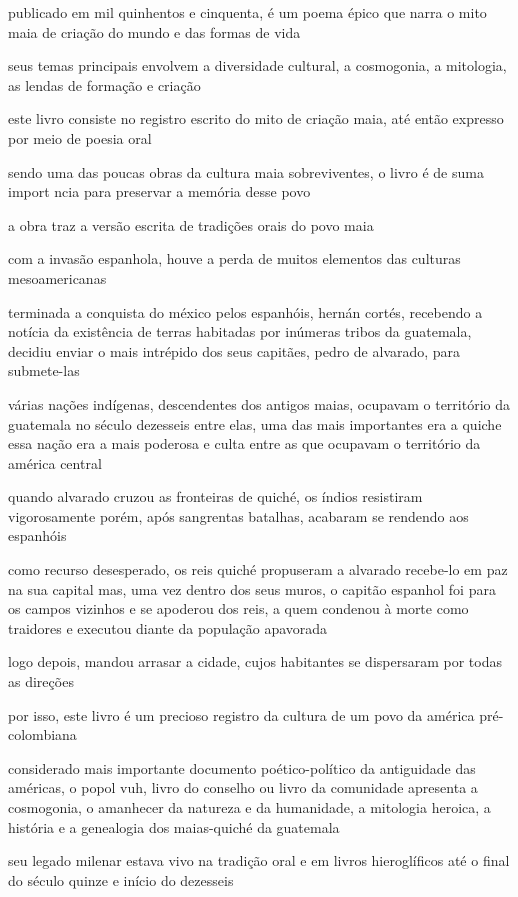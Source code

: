 publicado em mil quinhentos e cinquenta, é um poema épico que narra o mito maia de criação do mundo e das formas de vida

seus temas principais envolvem a diversidade cultural, a cosmogonia, a mitologia, as lendas de formação e criação


este livro consiste no registro escrito do mito de criação maia, até então expresso por meio de poesia oral

sendo uma das poucas obras da cultura maia sobreviventes, o livro é de suma import ncia para preservar a memória desse povo

a obra traz a versão escrita de tradições orais do povo maia 

com a invasão espanhola, houve a perda de muitos elementos das culturas mesoamericanas

terminada a conquista do méxico pelos espanhóis, hernán cortés, recebendo a notícia da existência de terras habitadas por inúmeras tribos da guatemala, decidiu enviar o mais intrépido dos seus capitães, pedro de alvarado, para submete-las

várias nações indígenas, descendentes dos antigos maias, ocupavam o território da guatemala no século dezesseis entre elas, uma das mais importantes era a quiche essa nação era a mais poderosa e culta entre as que ocupavam o território da américa central

quando alvarado cruzou as fronteiras de quiché, os índios resistiram vigorosamente porém, após sangrentas batalhas, acabaram se rendendo aos espanhóis

como recurso desesperado, os reis quiché propuseram a alvarado recebe-lo em paz na sua capital mas, uma vez dentro dos seus muros, o capitão espanhol foi para os campos vizinhos e se apoderou dos reis, a quem condenou à morte como traidores e executou diante da população apavorada

logo depois, mandou arrasar a cidade, cujos habitantes se dispersaram por todas as direções

por isso, este livro é um precioso registro da cultura de um povo da américa pré-colombiana

considerado mais importante documento poético-político da antiguidade das américas, o popol vuh, livro do conselho ou livro da comunidade apresenta a cosmogonia, o amanhecer da natureza e da humanidade, a mitologia heroica, a história e a genealogia dos maias-quiché da guatemala 

seu legado milenar estava vivo na tradição oral e em livros hieroglíficos até o final do século quinze e início do dezesseis

